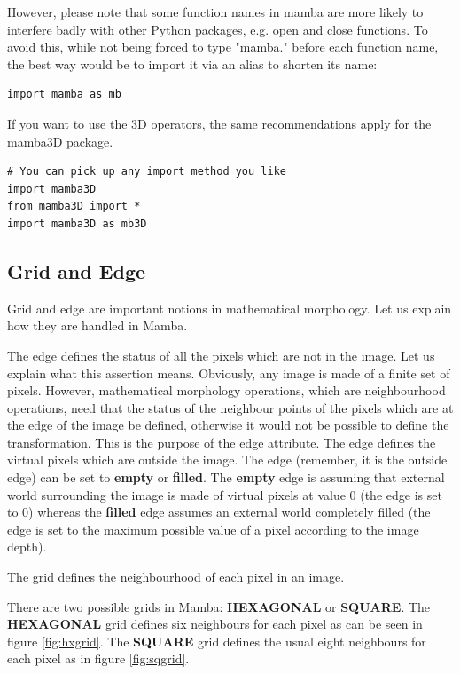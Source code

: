 \documentclass[a4paper,10pt,oneside]{article}
\begin{document}
However, please note that some function names in mamba are more likely to
interfere badly with other Python packages, e.g. open and close functions. To 
avoid this, while not being forced to type "mamba." before each function 
name, the best way would be to import it via an alias to shorten its name:

\lstset{language=Python}
\begin{lstlisting}
import mamba as mb
\end{lstlisting}

If you want to use the 3D operators, the same recommendations apply for the
mamba3D package.
\lstset{language=Python}
\begin{lstlisting}
# You can pick up any import method you like
import mamba3D
from mamba3D import *
import mamba3D as mb3D
\end{lstlisting}

\subsection{Grid and Edge}

Grid and edge are important notions in mathematical morphology. Let us explain
how they are handled in Mamba. 

The edge defines the status of all the pixels which are not in the image. Let us 
explain what this assertion means. Obviously, any image is made of a finite set 
of pixels. However, mathematical morphology operations, which are neighbourhood 
operations, need that the status of the neighbour points of the pixels which are at 
the edge of the image be defined, otherwise it would not be possible to define the 
transformation. This is the purpose of the edge attribute. The edge defines the 
virtual pixels which are outside the image. The edge (remember, it is the outside 
edge) can be set to \textbf{empty} or 
\textbf{filled}. The \textbf{empty} edge is assuming that external world surrounding 
the image is made of virtual pixels at value 0 (the edge is set to 0) whereas 
the \textbf{filled} edge assumes an external world completely filled 
(the edge is set to the maximum possible value of a pixel according to the image 
depth). 

The grid defines the neighbourhood of each pixel in an image.

There are two possible grids in Mamba: \textbf{HEXAGONAL} or \textbf{SQUARE}. The 
\textbf{HEXAGONAL} grid defines six neighbours for each pixel as can be seen in 
figure \ref{fig:hxgrid}. The \textbf{SQUARE} grid defines the usual eight 
neighbours for each pixel as in figure \ref{fig:sqgrid}.
\end{document}
